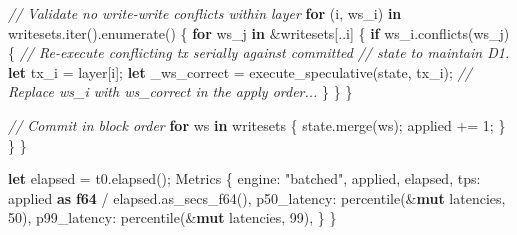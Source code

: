 \documentclass[11pt,a4paper]{article}
\providecommand{\NormalTok}[1]{#1}
\providecommand{\KeywordTok}[1]{\textbf{#1}}
\providecommand{\DataTypeTok}[1]{\textbf{#1}}
\providecommand{\CommentTok}[1]{\textit{#1}}
\providecommand{\StringTok}[1]{#1}
\providecommand{\OperatorTok}[1]{#1}
\providecommand{\ControlFlowTok}[1]{\textbf{#1}}
\providecommand{\DecValTok}[1]{#1}
\newenvironment{Shaded}{}{}
\newenvironment{Highlighting}[1][]{\par\noindent\begin{minipage}{\linewidth}\ttfamily\small}{\end{minipage}\par}
\begin{document}
\begin{Shaded}
\begin{Highlighting}[]
            \CommentTok{// Validate no write{-}write conflicts within layer}
            \ControlFlowTok{for}\NormalTok{ (i}\OperatorTok{,}\NormalTok{ ws\_i) }\KeywordTok{in}\NormalTok{ writesets}\OperatorTok{.}\NormalTok{iter()}\OperatorTok{.}\NormalTok{enumerate() }\OperatorTok{\{}
                \ControlFlowTok{for}\NormalTok{ ws\_j }\KeywordTok{in} \OperatorTok{\&}\NormalTok{writesets[}\OperatorTok{..}\NormalTok{i] }\OperatorTok{\{}
                    \ControlFlowTok{if}\NormalTok{ ws\_i}\OperatorTok{.}\NormalTok{conflicts(ws\_j) }\OperatorTok{\{}
                        \CommentTok{// Re{-}execute conflicting tx serially against committed}
                        \CommentTok{// state to maintain D1.}
                        \KeywordTok{let}\NormalTok{ tx\_i }\OperatorTok{=}\NormalTok{ layer[i]}\OperatorTok{;}
                        \KeywordTok{let}\NormalTok{ \_ws\_correct }\OperatorTok{=}\NormalTok{ execute\_speculative(state}\OperatorTok{,}\NormalTok{ tx\_i)}\OperatorTok{;}
                        \CommentTok{// Replace ws\_i with ws\_correct in the apply order...}
                    \OperatorTok{\}}
                \OperatorTok{\}}
            \OperatorTok{\}}

            \CommentTok{// Commit in block order}
            \ControlFlowTok{for}\NormalTok{ ws }\KeywordTok{in}\NormalTok{ writesets }\OperatorTok{\{}
\NormalTok{                state}\OperatorTok{.}\NormalTok{merge(ws)}\OperatorTok{;}
\NormalTok{                applied }\OperatorTok{+=} \DecValTok{1}\OperatorTok{;}
            \OperatorTok{\}}
        \OperatorTok{\}}
    \OperatorTok{\}}

    \KeywordTok{let}\NormalTok{ elapsed }\OperatorTok{=}\NormalTok{ t0}\OperatorTok{.}\NormalTok{elapsed()}\OperatorTok{;}
\NormalTok{    Metrics }\OperatorTok{\{}
\NormalTok{        engine}\OperatorTok{:} \StringTok{"batched"}\OperatorTok{,}
\NormalTok{        applied}\OperatorTok{,}
\NormalTok{        elapsed}\OperatorTok{,}
\NormalTok{        tps}\OperatorTok{:}\NormalTok{ applied }\KeywordTok{as} \DataTypeTok{f64} \OperatorTok{/}\NormalTok{ elapsed}\OperatorTok{.}\NormalTok{as\_secs\_f64()}\OperatorTok{,}
\NormalTok{        p50\_latency}\OperatorTok{:}\NormalTok{ percentile(}\OperatorTok{\&}\KeywordTok{mut}\NormalTok{ latencies}\OperatorTok{,} \DecValTok{50}\NormalTok{)}\OperatorTok{,}
\NormalTok{        p99\_latency}\OperatorTok{:}\NormalTok{ percentile(}\OperatorTok{\&}\KeywordTok{mut}\NormalTok{ latencies}\OperatorTok{,} \DecValTok{99}\NormalTok{)}\OperatorTok{,}
    \OperatorTok{\}}
\OperatorTok{\}}
\end{Highlighting}
\end{Shaded}
\end{document}
